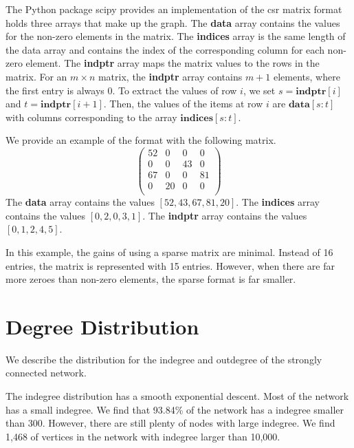 \documentclass{article}
\begin{document}
The Python package scipy provides an implementation of the csr matrix format holds three arrays that make up the graph. The \textbf{data} array contains the values for the non-zero elements in the matrix.
The \textbf{indices} array is the same length of the data array and contains the index of the corresponding column for each non-zero element.
The \textbf{indptr} array maps the matrix values to the rows in the matrix.
For an $m\times n$ matrix, the \textbf{indptr} array contains $m+1$ elements, where the first entry is always 0.
To extract the values of row $i$, we set $s = \textbf{indptr}[i]$ and $t = \textbf{indptr}[i+1]$. Then, the values of the items at row $i$ are $\textbf{data}[s:t]$ with columns corresponding to the array $\textbf{indices}[s:t]$. 


We provide an example of the format with the following matrix.
\begin{equation*}
    \begin{pmatrix}
        52 & 0  & 0  & 0  \\
        0  & 0  & 43 & 0  \\
        67 & 0  & 0  & 81  \\
        0  & 20 & 0  & 0  \\
    \end{pmatrix}
\end{equation*}
The \textbf{data} array contains the values $[52, 43, 67, 81, 20]$. The \textbf{indices} array contains the values $[0, 2, 0, 3, 1]$.
The \textbf{indptr} array contains the values $[0, 1, 2, 4, 5]$.

In this example, the gains of using a sparse matrix are minimal. Instead of 16 entries, the matrix is represented with 15 entries. However, when there are far more zeroes than non-zero elements, the sparse format is far smaller.



\section{Degree Distribution}

We describe the distribution for the indegree and outdegree of the strongly connected network.


The indegree distribution has a smooth exponential descent. Most of the network has a small indegree. We find that 93.84\% of the network has a indegree smaller than 300. However, there are still plenty of nodes with large indegree. We find 1,468 of vertices in the network with indegree larger than 10,000.
\end{document}
